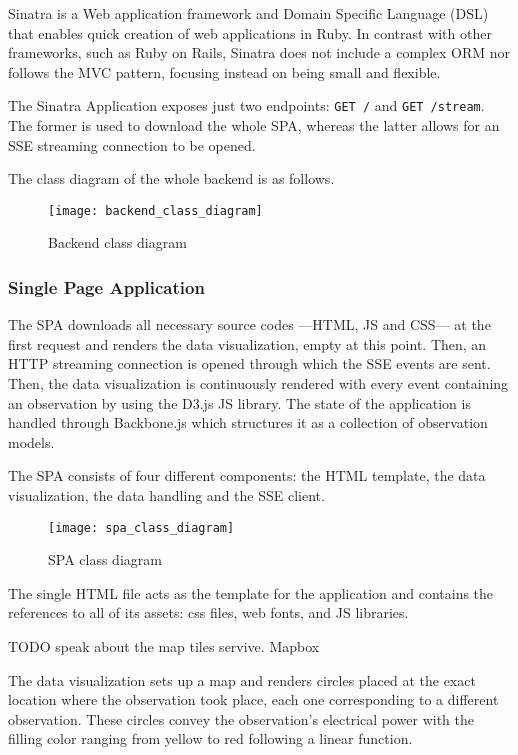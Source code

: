 Sinatra is a Web application framework and Domain Specific Language (DSL) that enables quick creation of web applications in Ruby. In contrast with other frameworks, such as Ruby on Rails, Sinatra does not include a complex ORM nor follows the MVC pattern, focusing instead on being small and flexible.

The Sinatra Application exposes just two endpoints: \texttt{GET /} and \texttt{GET /stream}. The former is used to download the whole SPA, whereas the latter allows for an SSE streaming connection to be opened.

The class diagram of the whole backend is as follows.

\begin{figure}[h]
	\centering
	\texttt{[image: backend\_class\_diagram]}
	\caption{Backend class diagram}
	\label{fig:backend_class_diagram}
\end{figure}

\subsubsection{Single Page Application}

The SPA downloads all necessary source codes ---HTML, JS and CSS--- at the first request and renders the data visualization, empty at this point. Then, an HTTP streaming connection is opened  through which the SSE events are sent. Then, the data visualization is continuously rendered with every event containing an observation by using the D3.js JS library. The state of the application is handled through Backbone.js which structures it as a collection of observation models.

The SPA consists of four different components: the HTML template, the data visualization, the data handling and the SSE client.

\begin{figure}[h]
	\centering
	\texttt{[image: spa\_class\_diagram]}
	\caption{SPA class diagram}
	\label{fig:spa_class_diagram}
\end{figure}

The single HTML file acts as the template for the application and contains the references to all of its assets: css files, web fonts, and JS libraries.

TODO speak about the map tiles servive. Mapbox

The data visualization sets up a map and renders circles placed at the exact location where the observation took place, each one corresponding to a different observation. These circles convey the observation's electrical power with the filling color ranging from yellow to red following a linear function.

